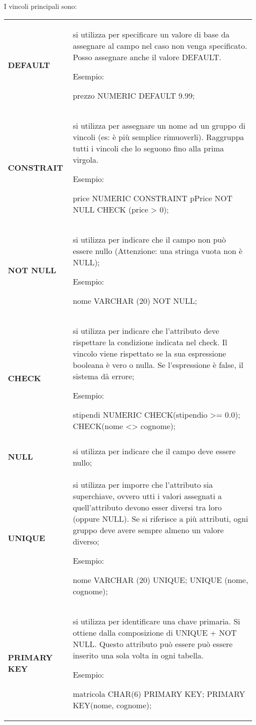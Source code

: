 \documentclass[a4paper, 10pt]{report}
\begin{document}
\noindent I vincoli principali sono:
\begin{longtable}{ p{}  p{}}
\textbf{DEFAULT} & si utilizza per specificare un valore di base da assegnare al campo nel caso non venga specificato. Posso assegnare anche il valore DEFAULT.
\newline

Esempio: 
\begin{code}
	prezzo NUMERIC DEFAULT 9.99;
\end{code}
\\
\textbf{CONSTRAIT} & si utilizza per assegnare un nome ad un gruppo di vincoli (es: è più semplice rimuoverli). Raggruppa tutti i vincoli che lo seguono fino alla prima virgola.
\newline

Esempio: 
\begin{code}
	price NUMERIC CONSTRAINT pPrice NOT NULL CHECK (price > 0);
\end{code}
\\
\textbf{NOT NULL} & si utilizza per indicare che il campo non può essere nullo (Attenzione: una stringa vuota non è NULL);
\newline

Esempio:
\begin{code}
	nome VARCHAR (20) NOT NULL;
\end{code}
\\
\textbf{CHECK} & si utilizza per indicare che l'attributo deve rispettare la condizione indicata nel check. Il vincolo viene rispettato se la sua espressione booleana è vero o nulla. Se l'espressione è false, il sistema dà errore;
\newline

Esempio:
\begin{code}
	stipendi NUMERIC CHECK(stipendio >= 0.0);
	CHECK(nome <> cognome);
\end{code}
\\\\
\textbf{NULL} & si utilizza per indicare che il campo deve essere nullo;
\\
\textbf{UNIQUE} & si utilizza per imporre che l'attributo sia superchiave, ovvero utti i valori assegnati a quell'attributo devono esser diversi tra loro (oppure NULL). Se si riferisce a più attributi, ogni gruppo deve avere sempre almeno un valore diverso;
\newline

Esempio:
\begin{code}
	nome VARCHAR (20) UNIQUE;
	UNIQUE (nome, cognome);
\end{code}
\\
\textbf{PRIMARY KEY} & si utilizza per identificare una chave primaria. Si ottiene dalla composizione di UNIQUE + NOT NULL. Questo attributo può essere può essere inserito una sola volta in ogni tabella.  
\newline

Esempio:
\begin{code}
	matricola CHAR(6) PRIMARY KEY;
	PRIMARY KEY(nome, cognome);
\end{code}
\end{longtable}
\end{document}
